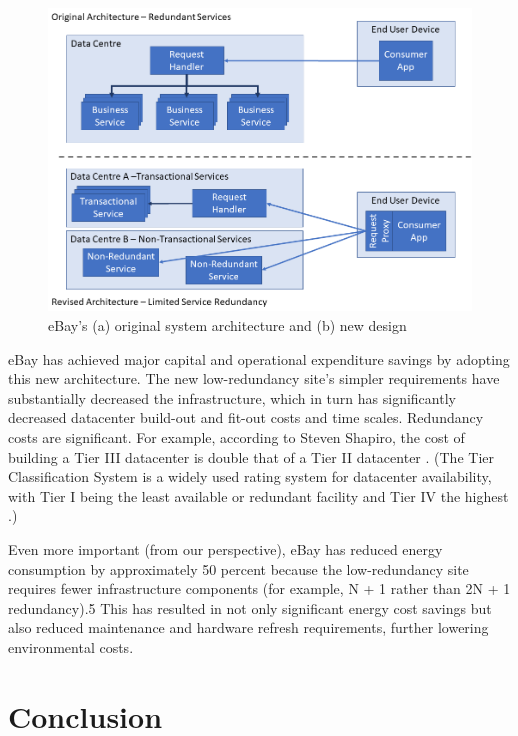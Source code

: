 \begin{figure}
\centering
\includegraphics[width=\textwidth]{Figures/principles-styles}
\caption{eBay's (a) original system architecture and (b) new design}
\label{figure:styles}
\end{figure}

eBay has achieved major capital and operational expenditure savings by adopting this new architecture. The new low-redundancy site's simpler requirements have substantially decreased the infrastructure, which in turn has significantly decreased datacenter build-out and fit-out costs and time scales. Redundancy costs are significant. For example, according to Steven Shapiro, the cost of building a Tier III datacenter is double that of a Tier II datacenter \cite{shapiro2015-datacentre-mythsrealities}. (The Tier Classification System is a widely used rating system for datacenter availability, with Tier I being the least available or redundant facility and Tier IV the highest \cite{uptime2015-tierclassification}.)

Even more important (from our perspective), eBay has reduced energy consumption by approximately 50 percent because the low-redundancy site requires fewer infrastructure components (for example, N + 1 rather than 2N + 1 redundancy).5 This has resulted in not only significant energy cost savings but also reduced maintenance and hardware refresh requirements, further lowering environmental costs.

\section{Conclusion}

